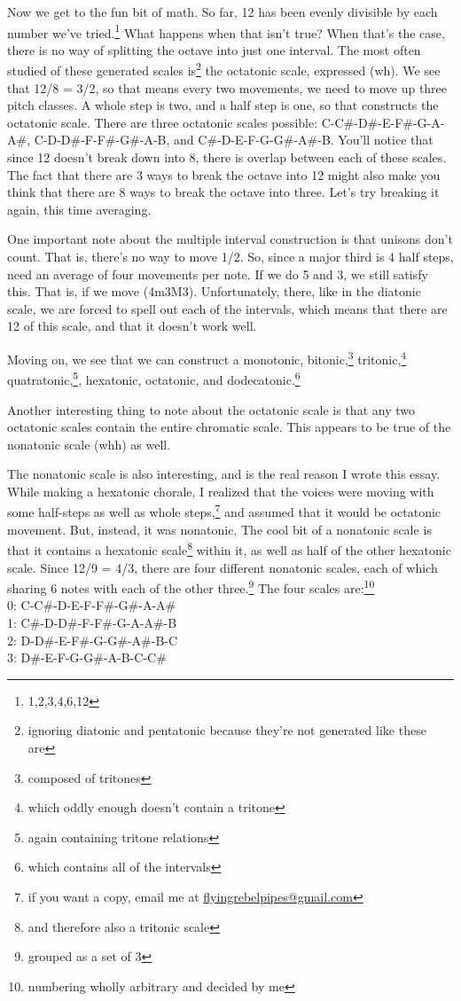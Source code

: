 \documentclass[12pt]{article}[titlepage]
\newcommand{\1}{\={a}}
\newcommand{\2}{\={e}}
\newcommand{\3}{\={\i}}
\newcommand{\4}{\=o}
\newcommand{\5}{\=u}
\newcommand{\6}{\={A}}
\renewcommand{\,}{\textsuperscript{,}}
\begin{document}
Now we get to the fun bit of math.
So far, 12 has been evenly divisible by each number we've tried.\footnote{1,2,3,4,6,12}
What happens when that isn't true?
When that's the case, there is no way of splitting the octave into just one interval.
The most often studied of these generated scales is\footnote{ignoring diatonic and pentatonic because they're not generated like these are} the octatonic scale, expressed (wh).
We see that 12/8 = 3/2, so that means every two movements, we need to move up three pitch classes.
A whole step is two, and a half step is one, so that constructs the octatonic scale.
There are three octatonic scales possible: C-C\#-D\#-E-F\#-G-A-A\#, C-D-D\#-F-F\#-G\#-A-B, and C\#-D-E-F-G-G\#-A\#-B.
You'll notice that since 12 doesn't break down into 8, there is overlap between each of these scales.
The fact that there are 3 ways to break the octave into 12 might also make you think that there are 8 ways to break the octave into three.
Let's try breaking it again, this time averaging.

One important note about the multiple interval construction is that unisons don't count.
That is, there's no way to move 1/2.
So, since a major third is 4 half steps, need an average of four movements per note.
If we do 5 and 3, we still satisfy this.
That is, if we move (4m3M3).
Unfortunately, there, like in the diatonic scale, we are forced to spell out each of the intervals, which means that there are 12 of this scale, and that it doesn't work well.

Moving on, we see that we can construct a monotonic, bitonic,\footnote{composed of tritones} tritonic,\footnote{which oddly enough doesn't contain a tritone} quatratonic,\footnote{again containing tritone relations}, hexatonic, octatonic, and dodecatonic.\footnote{which contains all of the intervals}

Another interesting thing to note about the octatonic scale is that any two octatonic scales contain the entire chromatic scale.
This appears to be true of the nonatonic scale (whh) as well.

The nonatonic scale is also interesting, and is the real reason I wrote this essay.
While making a hexatonic chorale, I realized that the voices were moving with some half-steps as well as whole steps,\footnote{if you want a copy, email me at \href{mailto:flyingrebelpipes@gmail.com}{flyingrebelpipes@gmail.com}} and assumed that it would be octatonic movement.
But, instead, it was nonatonic.
The cool bit of a nonatonic scale is that it contains a hexatonic scale\footnote{and therefore also a tritonic scale} within it, as well as half of the other hexatonic scale.
Since 12/9 = 4/3, there are four different nonatonic scales, each of which sharing 6 notes with each of the other three.\footnote{grouped as a set of 3}
The four scales are:\footnote{numbering wholly arbitrary and decided by me}\\
0: C-C\#-D-E-F-F\#-G\#-A-A\#\\
1: C\#-D-D\#-F-F\#-G-A-A\#-B\\
2: D-D\#-E-F\#-G-G\#-A\#-B-C\\
3: D\#-E-F-G-G\#-A-B-C-C\#\\
\end{document}

